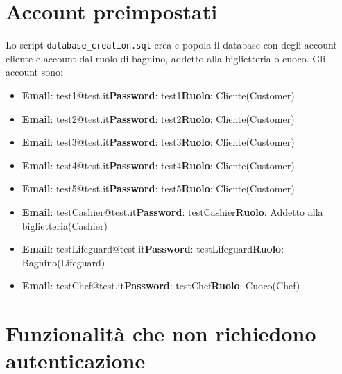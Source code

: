 \documentclass{article}
\begin{document}
\section{Account preimpostati}
Lo script \texttt{database\_creation.sql} crea e popola il database con degli account cliente e account dal ruolo di bagnino, addetto alla biglietteria o cuoco.
Gli account sono:
\begin{itemize}
	\item \textbf{Email}: test1@test.it\newline\textbf{Password}: test1\newline\textbf{Ruolo}: Cliente(Customer)
	\item \textbf{Email}: test2@test.it\newline\textbf{Password}: test2\newline\textbf{Ruolo}: Cliente(Customer)
	\item \textbf{Email}: test3@test.it\newline\textbf{Password}: test3\newline\textbf{Ruolo}: Cliente(Customer)
	\item \textbf{Email}: test4@test.it\newline\textbf{Password}: test4\newline\textbf{Ruolo}: Cliente(Customer)
	\item \textbf{Email}: test5@test.it\newline\textbf{Password}: test5\newline\textbf{Ruolo}: Cliente(Customer)
	\item \textbf{Email}: testCashier@test.it\newline\textbf{Password}: testCashier\newline\textbf{Ruolo}: Addetto alla biglietteria(Cashier)
	\item \textbf{Email}: testLifeguard@test.it\newline\textbf{Password}: testLifeguard\newline\textbf{Ruolo}: Bagnino(Lifeguard)
	\item \textbf{Email}: testChef@test.it\newline\textbf{Password}: testChef\newline\textbf{Ruolo}: Cuoco(Chef)
\end{itemize}
\newpage
\section{Funzionalità che non richiedono autenticazione}
\end{document}
